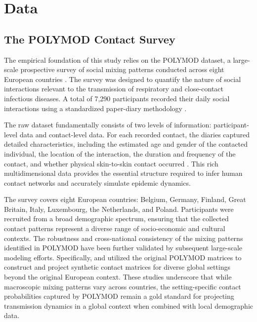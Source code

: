 \section{Data}
\label{sec:data}

\subsection{The POLYMOD Contact Survey}
\label{subsec:polymod_intro}
The empirical foundation of this study relies on the POLYMOD dataset, a large-scale prospective survey of social mixing patterns conducted across eight European countries \parencite{mossong2008social}.
The survey was designed to quantify the nature of social interactions relevant to the transmission of respiratory and close-contact infectious diseases.
A total of 7,290 participants recorded their daily social interactions using a standardized paper-diary methodology \parencite{mossong2008social}.

The raw dataset fundamentally consists of two levels of information: participant-level data and contact-level data.
For each recorded contact, the diaries captured detailed characteristics, including the estimated age and gender of the contacted individual, the location of the interaction, the duration and frequency of the contact, and whether physical skin-to-skin contact occurred \parencite{mossong2008social}.
This rich multidimensional data provides the essential structure required to infer human contact networks and accurately simulate epidemic dynamics.

The survey covers eight European countries: Belgium, Germany, Finland, Great Britain, Italy, Luxembourg, the Netherlands, and Poland.
Participants were recruited from a broad demographic spectrum, ensuring that the collected contact patterns represent a diverse range of socio-economic and cultural contexts.
The robustness and cross-national consistency of the mixing patterns identified in POLYMOD have been further validated by subsequent large-scale modeling efforts.
Specifically, \textcite{prem2017projecting} and \textcite{mistry2021inferring} utilized the original POLYMOD matrices to construct and project synthetic contact matrices for diverse global settings beyond the original European context.
These studies underscore that while macroscopic mixing patterns vary across countries, the setting-specific contact probabilities captured by POLYMOD remain a gold standard for projecting transmission dynamics in a global context when combined with local demographic data.

